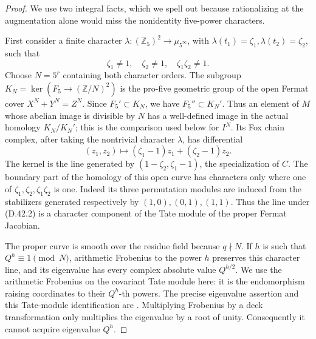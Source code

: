 \begin{proof}
We use two integral facts, which we spell out because
rationalizing at the augmentation alone would miss
the nonidentity five-power characters.

First consider a finite character
\(\lambda:(\mathbb Z_5)^2\to\mu_{5^\infty}\), with
\(\lambda(t_1)=\zeta_1,\lambda(t_2)=\zeta_2\), such that
\[
             \zeta_1\ne1,\quad\zeta_2\ne1,\quad
                                      \zeta_1\zeta_2\ne1. \tag{D.42.2}
\]
Choose \(N=5^r\) containing both character orders.
The subgroup \(K_N=\ker(F_5\to(\mathbb Z/N)^2)\)
is the pro-five geometric group of the open Fermat
cover \(X^N+Y^N=Z^N\).
Since \(F_5'\subset K_N\), we have
\(F_5''\subset K_N'\). Thus an element of \(M\)
whose abelian image is divisible by \(N\)
has a well-defined image in the actual
homology \(K_N/K_N'\); this is the comparison
used below for \(I^N\).
Its Fox chain complex,
after taking the nontrivial character \(\lambda\),
has differential
\[
 (z_1,z_2)\longmapsto
       (\zeta_1-1)z_1+(\zeta_2-1)z_2.
\]
The kernel is the line generated by
\((1-\zeta_2,\zeta_1-1)\), the specialization of \(C\).
The boundary part of the homology of this open curve
has characters only where one of
\(\zeta_1,\zeta_2,\zeta_1\zeta_2\) is one.
Indeed its three permutation modules are induced
from the stabilizers generated respectively by
\((1,0),(0,1),(1,1)\). Thus the line under (D.42.2)
is a character component of the Tate module of the
proper Fermat Jacobian.

The proper curve is smooth over the residue field
because \(q\nmid N\). If \(h\) is such that
\(Q^h\equiv1\pmod N\), arithmetic Frobenius to the
power \(h\) preserves this character line, and its
eigenvalue has every complex absolute value
\(Q^{h/2}\). We use the arithmetic Frobenius on the
covariant Tate module here: it is the endomorphism
raising coordinates to their \(Q^h\)-th powers.
The precise eigenvalue assertion and this Tate-module
identification are
\cite[Theorem 14.1(b), and (9.20)]{DE_MilneAV}.
Multiplying Frobenius by a deck transformation
only multiplies the eigenvalue by a root of unity.
Consequently it cannot acquire eigenvalue \(Q^h\).


\end{proof}
